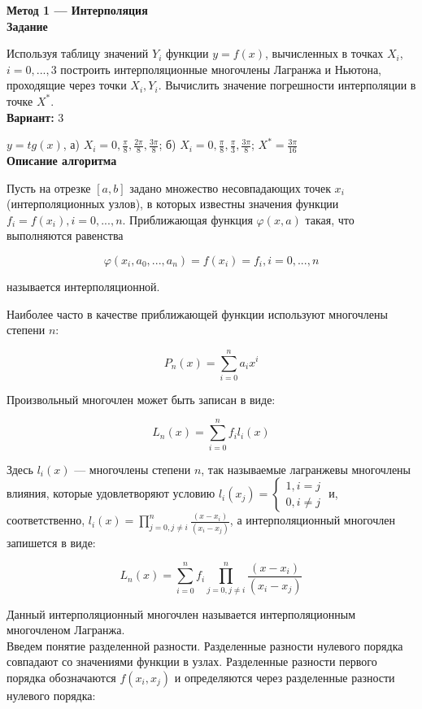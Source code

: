 \textbf{Метод 1 --- Интерполяция}\\

\textbf{Задание}

Используя таблицу значений $Y_i$ функции $y=f(x)$, вычисленных в точках $X_i$, $i=0,...,3$ построить интерполяционные многочлены Лагранжа и Ньютона, проходящие через точки ${X_i, Y_i}$. Вычислить значение погрешности интерполяции в точке $X^*$.\\

\textbf{Вариант:} 3

$y=tg(x)$, а) $X_i=0, \frac{\pi}{8}, \frac{2\pi}{8}, \frac{3\pi}{8}$; б) $X_i=0, \frac{\pi}{8}, \frac{\pi}{3}, \frac{3\pi}{8}$; $X^*=\frac{3\pi}{16}$\\

\textbf{Описание алгоритма}

Пусть на отрезке $[a, b]$ задано множество несовпадающих точек $x_i$ (интерполяционных узлов), в которых известны значения функции $f_i=f(x_i), i=0,...,n$. Приближающая функция $\varphi(x, a)$ такая, что выполняются равенства

$$
\varphi(x_i, a_0, ..., a_n)=f(x_i)=f_i, i=0,...,n
$$

называется интерполяционной.

Наиболее часто в качестве приближающей функции используют многочлены степени $n$:

$$
P_n(x)=\sum\limits_{i=0}^na_ix^i
$$

Произвольный многочлен может быть записан в виде:

$$
L_n(x)=\sum\limits_{i=0}^nf_il_i(x)
$$

Здесь $l_i(x)$ --- многочлены степени $n$, так называемые лагранжевы многочлены влияния, которые удовлетворяют условию $l_i(x_j)=\begin{cases}
1, i = j\\
0, i \neq j
\end{cases}$ и, соответственно, $l_i(x)=\prod\limits_{j=0,j \neq i}^n\frac{(x-x_i)}{(x_i-x_j)}$, а интерполяционный многочлен запишется в виде:

$$
L_n(x)=\sum\limits_{i=0}^nf_i\prod\limits_{j=0, j \neq i}^n\frac{(x-x_i)}{(x_i-x_j)}
$$

\pagebreak

Данный интерполяционный многочлен называется интерполяционным многочленом Лагранжа.\\

Введем понятие разделенной разности. Разделенные разности нулевого порядка совпадают со значениями функции в узлах. Разделенные разности первого порядка обозначаются $f(x_i,x_j)$ и определяются через разделенные разности нулевого порядка:

